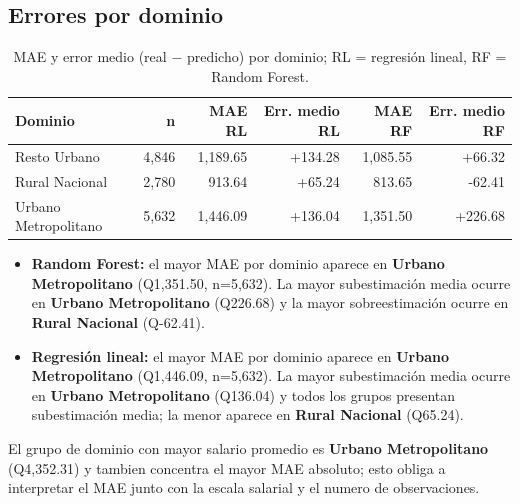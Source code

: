 \subsection{Errores por dominio}
\begin{table}[htbp]\centering\footnotesize
\begin{tabular}{lrrrrr}\toprule
Dominio & n & MAE RL & Err. medio RL & MAE RF & Err. medio RF \\ \midrule
Resto Urbano & 4,846 & 1,189.65 & +134.28 & 1,085.55 & +66.32 \\
Rural Nacional & 2,780 & 913.64 & +65.24 & 813.65 & -62.41 \\
Urbano Metropolitano & 5,632 & 1,446.09 & +136.04 & 1,351.50 & +226.68 \\
\bottomrule\end{tabular}
\caption{MAE y error medio (real $-$ predicho) por dominio; RL = regresión lineal, RF = Random Forest.}
\end{table}
\begin{itemize}\setlength{\itemsep}{2pt}
\item \textbf{Random Forest:} el mayor MAE por dominio aparece en \textbf{Urbano Metropolitano} (Q1,351.50, n=5,632). La mayor subestimación media ocurre en \textbf{Urbano Metropolitano} (Q226.68) y la mayor sobreestimación ocurre en \textbf{Rural Nacional} (Q-62.41).
\item \textbf{Regresión lineal:} el mayor MAE por dominio aparece en \textbf{Urbano Metropolitano} (Q1,446.09, n=5,632). La mayor subestimación media ocurre en \textbf{Urbano Metropolitano} (Q136.04) y todos los grupos presentan subestimación media; la menor aparece en \textbf{Rural Nacional} (Q65.24).
\end{itemize}

El grupo de dominio con mayor salario promedio es \textbf{Urbano Metropolitano} (Q4,352.31) y tambien concentra el mayor MAE absoluto; esto obliga a interpretar el MAE junto con la escala salarial y el numero de observaciones.

